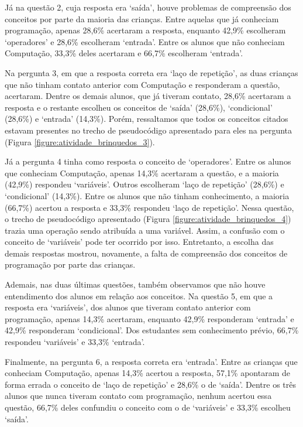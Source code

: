 Já na questão 2, cuja resposta era \enquote*{saída}, houve problemas de compreensão dos conceitos por parte da maioria das crianças. Entre aquelas que já conheciam programação, apenas 28,6\% acertaram a resposta, enquanto 42,9\% escolheram \enquote*{operadores} e 28,6\% escolheram \enquote*{entrada}. Entre os alunos que não conheciam Computação, 33,3\% deles acertaram e 66,7\% escolheram \enquote*{entrada}.

Na pergunta 3, em que a resposta correta era \enquote*{laço de repetição}, as duas crianças que não tinham contato anterior com Computação e responderam a questão, acertaram. Dentre os demais alunos, que já tiveram contato, 28,6\% acertaram a resposta e o restante escolheu os conceitos de \enquote*{saída} (28,6\%), \enquote*{condicional} (28,6\%) e \enquote*{entrada} (14,3\%). Porém, ressaltamos que todos os conceitos citados estavam presentes no trecho de pseudocódigo apresentado para eles na pergunta (Figura \ref{figure:atividade_brinquedos_3}).

Já a pergunta 4 tinha como resposta o conceito de \enquote*{operadores}. Entre os alunos que conheciam Computação, apenas 14,3\% acertaram a questão, e a maioria (42,9\%) respondeu \enquote*{variáveis}. Outros escolheram \enquote*{laço de repetição} (28,6\%) e \enquote*{condicional} (14,3\%). Entre os alunos que não tinham conhecimento, a maioria (66,7\%) acertou a resposta e 33,3\% respondeu \enquote*{laço de repetição}. Nessa questão, o trecho de pseudocódigo apresentado (Figura \ref{figure:atividade_brinquedos_4}) trazia uma operação sendo atribuída a uma variável. Assim, a confusão com o conceito de \enquote*{variáveis} pode ter ocorrido por isso. Entretanto, a escolha das demais respostas mostrou, novamente, a falta de compreensão dos conceitos de programação por parte das crianças.

Ademais, nas duas últimas questões, também observamos que não houve entendimento dos alunos em relação aos conceitos. Na questão 5, em que a resposta era \enquote*{variáveis}, dos alunos que tiveram contato anterior com programação, apenas 14,3\% acertaram, enquanto 42,9\% responderam \enquote*{entrada} e 42,9\% responderam \enquote*{condicional}. Dos estudantes sem conhecimento prévio, 66,7\% respondeu \enquote*{variáveis} e 33,3\% \enquote*{entrada}.

Finalmente, na pergunta 6, a resposta correta era \enquote*{entrada}. Entre as crianças que conheciam Computação, apenas 14,3\% acertou a resposta, 57,1\% apontaram de forma errada o conceito de \enquote*{laço de repetição} e 28,6\% o de \enquote*{saída}. Dentre os três alunos que nunca tiveram contato com programação, nenhum acertou essa questão, 66,7\% deles confundiu o conceito com o de \enquote*{variáveis} e 33,3\% escolheu \enquote*{saída}.

